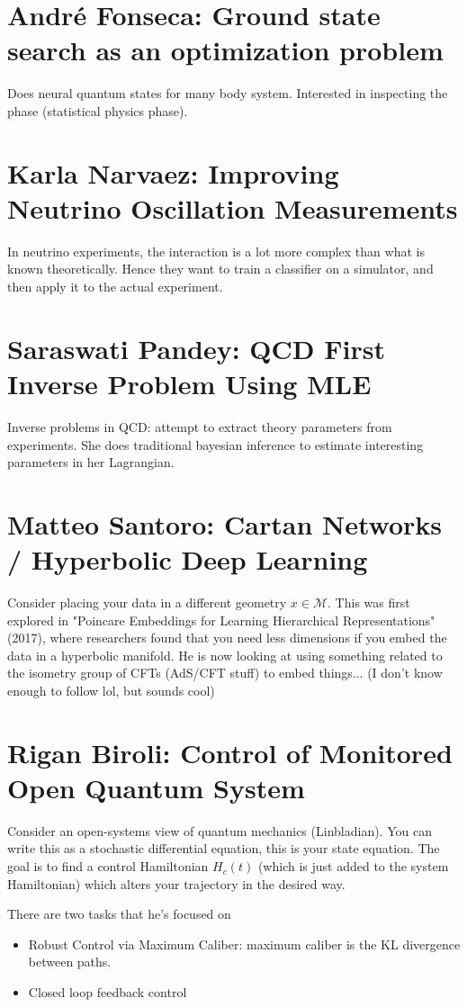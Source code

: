 \section{Andr\'e Fonseca: Ground state search as an optimization problem}
Does neural quantum states for many body system. Interested in inspecting the phase (statistical physics phase).

\section{Karla Narvaez: Improving Neutrino Oscillation Measurements}
In neutrino experiments, the interaction is a lot more complex than what is known theoretically. Hence they want to train a classifier on a simulator, and then apply it to the actual experiment.

\section{Saraswati Pandey: QCD First Inverse Problem Using MLE}
Inverse problems in QCD: attempt to extract theory parameters from experiments. She does traditional bayesian inference to estimate interesting parameters in her Lagrangian.

\section{Matteo Santoro: Cartan Networks / Hyperbolic Deep Learning}
Consider placing your data in a different geometry $x \in \mathcal M$. This was first explored in "Poincare Embeddings for Learning Hierarchical Representations" (2017), where researchers found that you need less dimensions if you embed the data in a hyperbolic manifold. He is now looking at using something related to the isometry group of CFTs (AdS/CFT stuff) to embed things... (I don't know enough to follow lol, but sounds cool)

\section{Rigan Biroli: Control of Monitored Open Quantum System}
Consider an open-systems view of quantum mechanics (Linbladian). You can write this as a stochastic differential equation, this is your state equation. The goal is to find a control Hamiltonian $H_c(t)$ (which is just added to the system Hamiltonian) which alters your trajectory in the desired way. 

There are two tasks that he's focused on
\begin{itemize}
	\item Robust Control via Maximum Caliber: maximum caliber is the KL divergence between paths. 
	\item Closed loop feedback control
\end{itemize}

